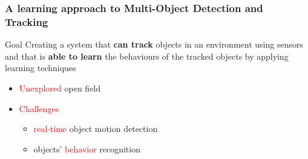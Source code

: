 \begin{frame}
\begin{center}
	\end{center}
\end{frame}

\begin{frame}
	\frametitle{A learning approach to Multi-Object Detection and Tracking}
	
	\vspace{-2.5cm}
	
	{
		\begin{block}{Goal}
			Creating a system that \textbf{can track} objects in an environment using sensors and that is \textbf{able to learn} the behaviours of the tracked objects by applying learning techniques
		\end{block}
	}
	
	{
		\begin{itemize}
			\item \large\textcolor{red}{Unexplored} open field
		\end{itemize}
	}
	
	{
		\vspace{-1cm}
	}
	
	{
		\begin{itemize}
			\item \large\textcolor{red}{Challenges}
			
			\begin{itemize}
				\item \large\textcolor{red}{real-time} object motion detection
				\item objects' \large\textcolor{red}{behavior} recognition
			\end{itemize}
		\end{itemize}
	}
	
	{
		\vspace{-3.07cm}
	}
\end{frame}

